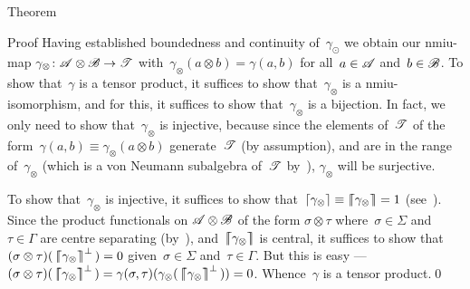 \documentclass[a]{subfiles}
\begin{document}
\begin{parsec}
\begin{point}{Theorem}
\begin{point}{Proof}
Having established boundedness and continuity
of~$\gamma_\odot$
we obtain our  nmiu-map $\gamma_\otimes\colon \mathscr{A}\otimes\mathscr{B}
\to\mathscr{T}$
with~$\gamma_\otimes(a\otimes b)=\gamma(a,b)$
for all~$a\in\mathscr{A}$ and~$b\in \mathscr{B}$.
To show that~$\gamma$ is a tensor product,
it suffices
to show that~$\gamma_\otimes$
is a nmiu-isomorphism,
and for this,
it suffices
to show that~$\gamma_\otimes$ is a bijection.
In fact, 
we only need to show that~$\gamma_\otimes$ is injective,
because since the elements
of~$\mathscr{T}$ of the form~$\gamma(a,b)\equiv\gamma_\otimes(a\otimes b)$
generate~$\mathscr{T}$ (by assumption),
and are in the range of~$\gamma_\otimes$
(which is a von Neumann subalgebra of~$\mathscr{T}$
by~),
$\gamma_\otimes$ will be surjective.

To show that~$\gamma_\otimes$ is injective,
it suffices to show that~$\left\lceil\gamma_\otimes\right\rceil\equiv\left\lceil\!\!\left\lceil\gamma_\otimes\right\rceil\!\!\right\rceil
=1$
(see~).
Since the product functionals on $\mathscr{A}\otimes\mathscr{B}$
of the form $\sigma\otimes \tau$
where~$\sigma\in\Sigma$ and~$\tau\in\Gamma$
are centre separating (by~),
and~$\left\lceil\!\!\left\lceil\gamma_\otimes\right\rceil\!\!\right\rceil$ is central,
it suffices to show that
$(\sigma\otimes\tau)(\,\left\lceil\!\!\left\lceil\gamma_\otimes\right\rceil\!\!\right\rceil^\perp\,)=0$
given~$\sigma\in\Sigma$ and~$\tau\in\Gamma$.
But this is easy ---
$(\sigma\otimes \tau)(\,\cceil{\gamma_\otimes}^\perp \,)
=
\gamma(\sigma, \tau)(\gamma_\otimes(\,\cceil{\gamma_\otimes}^\perp \,))
= 0$.
Whence~$\gamma$ is a tensor product.\qed
\end{point}
\end{point}
\end{parsec}
\end{document}
